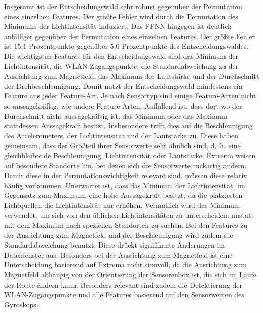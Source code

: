 \newline
Insgesamt ist der Entscheidungswald sehr robust gegenüber der Permutation eines einzelnen Features.
Der größte Fehler wird durch die Permutation des Minimums der Lichtintensität induziert.
Das FFNN hingegen ist deutlich anfälliger gegenüber der Permutation eines einzelnen Features.
Der größte Fehler ist 15,1 Prozentpunkte gegenüber 5,0 Prozentpunkte des Entscheidungswaldes.
\newline
\newline
Die wichtigsten Features für den Entscheidungswald sind das Minimum der Lichtintensität, die WLAN-Zugangspunkte, die Standardabweichung zu der Ausrichtung zum Magnetfeld,
das Maximum der Lautstärke und der Durchschnitt der Drehbeschleunigung.
Damit nutzt der Entscheidungswald mindestens ein Feature aus jeder Feature-Art.
Je nach Sensortyp sind einige Feature-Arten nicht so aussagekräftig, wie andere Feature-Arten.
\newline
\newline
Auffallend ist, dass dort wo der Durchschnitt nicht aussagekräftig ist, das Minimum oder das Maximum stattdessen Aussagekraft besitzt.
Insbesondere trifft dies auf die Beschleunigung des Accelerometers, der Lichtintensität und der Lautstärke zu.
Diese haben gemeinsam, dass der Großteil ihrer Sensorwerte sehr ähnlich sind,
d.~h. eine gleichbleibende Beschleunigung, Lichtintensität oder Lautstärke.
Extrema weisen auf besondere Standorte hin, bei denen sich die Sensorwerte ruckartig ändern.
Damit diese in der Permutationswichtigkeit relevant sind, müssen diese relativ häufig vorkommen.
\newpage
Unerwartet ist, dass das Minimum der Lichtintensität, im Gegensatz zum Maximum, eine hohe Aussagekraft besitzt, da die platzierten Lichtquellen die Lichtintensität nur erhöhen.
Vermutlich wird das Minimum verwendet, um sich von den üblichen Lichtintensitäten zu unterscheiden, anstatt mit dem Maximum nach speziellen Standorten zu suchen.
\newline
\newline
Bei den Features zu der Ausrichtung zum Magnetfeld und der Beschleunigung wird zudem die Standardabweichung benutzt.
Diese drückt signifikante Änderungen im Datenfenster aus.
Besonders bei der Ausrichtung zum Magnetfeld ist eine Unterscheidung basierend auf Extrema nicht sinnvoll,
da die Ausrichtung zum Magnetfeld abhängig von der Orientierung der Sensorenbox ist, die sich im Laufe der Route ändern kann.
\newline
\newline
Besonders relevant sind zudem die Detektierung der WLAN-Zugangspunkte und alle Features basierend auf den Sensorwerten des Gyroskops.

